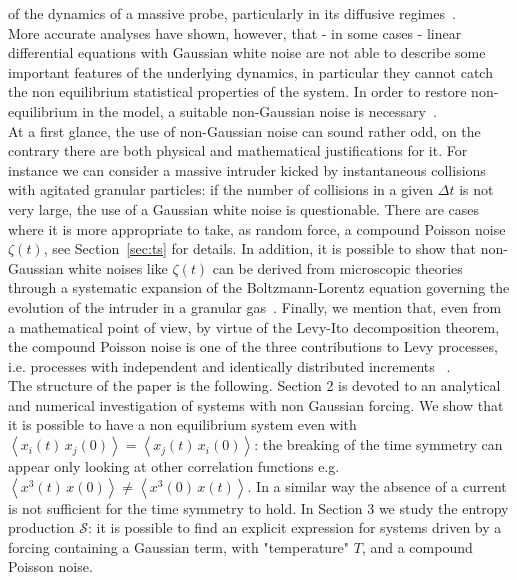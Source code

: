 \documentclass[12pt]{iopart}
\newcommand{\lx} {\left}
\newcommand{\rx} {\right}
\newcommand{\ave}[1] {\lx\langle #1 \rx\rangle}
\newcommand{\cS} {\mathcal{S}}
\begin{document}
 of the dynamics of a massive probe, particularly in its  diffusive regimes~\cite{scalliet2015cages,lasanta2015itinerant,baldovin2019langevin,plati2020slow}.\\
More accurate analyses have shown, however, that - in some cases -  linear differential equations with Gaussian white noise 
are not able to describe some important features of the underlying dynamics, in particular they cannot catch the non equilibrium statistical properties of the system. In order to restore 
non-equilibrium in the model, a suitable non-Gaussian noise is necessary~\cite{lucente2023out}.\\
At a first glance, the use of non-Gaussian noise can sound rather odd,
on the contrary  there are both   physical and  mathematical justifications for it.
For instance  we can consider a massive intruder  kicked by instantaneous collisions with agitated granular particles:
if the number of collisions in a given $\Delta t$ is not  very large,
the use of a Gaussian white noise is questionable. There are cases where it is more appropriate to take, as random force,
 a compound Poisson noise  $\zeta(t)$, see Section~\ref{sec:ts} for details.
In addition, it is possible to  show that non-Gaussian white noises like $\zeta(t)$  can be derived from microscopic theories through a systematic expansion of the Boltzmann-Lorentz equation governing the evolution of the intruder in a granular gas~\cite{kanazawa2012stochastic,kanazawa2015minimal,kanazawa2015asymptotic,kanazawa2017statistical}.
 Finally, we mention that,
  even from a mathematical point of view, by virtue of the Levy-Ito decomposition theorem, 
 the compound Poisson noise is one of the three contributions to Levy processes, i.e. processes with
  independent and identically distributed increments ~\cite{ken1999levy,kyprianou2014fluctuations,schilling2016introduction}. 
  \\
  The structure of the paper is the following.
  Section 2 is devoted to an analytical  and numerical investigation of systems with non Gaussian forcing.
  We show  that it is possible to have a non equilibrium system  even with  $\ave{x_i(t)\, x_j (0)}=\ave{x_j(t)\, x_i (0)}$:
  the breaking of the time symmetry can  appear only looking at  other correlation functions e.g.  $\ave{x^3(t)\, x (0)}\neq \ave{x^3(0)\, x (t) }$.
  In a similar way the absence of a current is not sufficient for the time symmetry to hold.
In Section 3  we study the entropy production $\cS$: it is possible to find an explicit expression
for systems driven by a forcing containing a  Gaussian term, with "temperature" $T$, and a compound Poisson noise.
\end{document}
